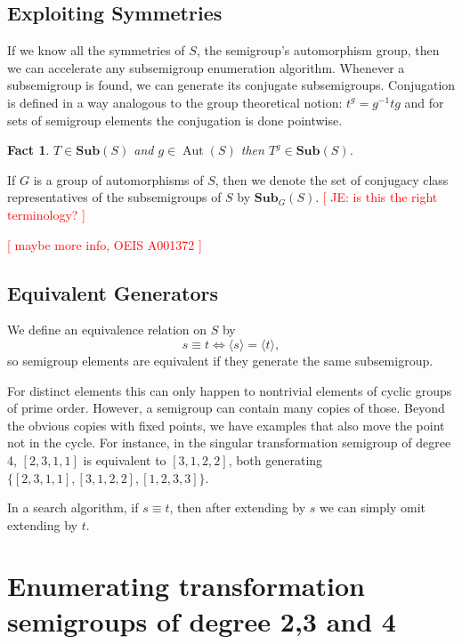 \documentclass{amsart}
\newcommand{\Sub}{\mathbf{Sub}}
\DeclareMathOperator{\Aut}{Aut}
\newcommand{\todo}[1]{\textcolor{red}{ \small \textsf{[ #1 ]} \normalsize}}
\theoremstyle{plain}
\newtheorem{fact}[theorem]{Fact}
\theoremstyle{definition}
\begin{document}
\subsection{Exploiting Symmetries}
If we know all the symmetries of $S$, the semigroup's automorphism group, then we can accelerate any subsemigroup enumeration algorithm.
Whenever a subsemigroup is found, we can generate its conjugate subsemigroups.
Conjugation is defined in a way analogous to the group theoretical notion: $t^g=g^{-1}tg$ and for sets of semigroup elements the conjugation is done pointwise.
 
\begin{fact}
$T\in\Sub(S)$ and $g\in \Aut(S)$ then $T^g\in\Sub(S)$.%
\end{fact}

If $G$ is a group of automorphisms of $S$, then we denote the set of conjugacy class representatives of the subsemigroups of $S$ by $\Sub_G(S)$. \todo{JE: is this the right terminology?}

\todo{maybe more info, OEIS A001372}


\subsection{Equivalent Generators}
\label{sec:equivgen}
We define an equivalence relation on $S$ by
$$ s\equiv t \Longleftrightarrow \langle s \rangle= \langle t  \rangle,$$
so semigroup elements are equivalent if they generate the same subsemigroup.

For distinct elements this can only happen to nontrivial elements of cyclic groups of prime order.
However, a semigroup can contain many copies of those.
Beyond the obvious copies with fixed points, we have examples that also move the point not in the cycle. For instance, in the singular transformation semigroup of degree 4, $[ 2, 3, 1, 1 ]$ is equivalent to  $[ 3, 1, 2, 2 ]$, both generating $\{ [ 2, 3, 1, 1 ], [ 3, 1, 2, 2 ], [ 1, 2, 3, 3 ]\}$.

In a search algorithm, if $s\equiv t$, then after extending by $s$ we can simply omit extending by $t$.

\section{Enumerating transformation semigroups of degree 2,3 and 4}
\label{sec:fulltranssgp}
\end{document}
